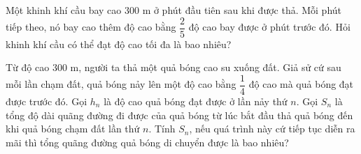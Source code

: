 \begin{bt}%

	Một khinh khí cầu bay cao $300$ m ở phút đầu tiên sau khi được thả. Mỗi phút tiếp theo, nó bay cao 
thêm độ cao bằng $\dfrac{2}{5}$ độ cao bay được ở phút trước đó. Hỏi khinh khí cầu có thể đạt độ cao tối đa là bao nhiêu?
\end{bt}

\begin{bt}%
%
	Từ độ cao $300$ m, người ta thả một quả bóng cao su xuống đất. Giả sử cứ sau mỗi lần chạm đất, quả bóng nảy lên một độ cao bằng $\dfrac{1}{4}$ độ cao mà quả bóng đạt được trước đó. Gọi $h_n$ là độ cao quả bóng đạt được ở lần nảy thứ $n$. Gọi $S_n$ là tổng độ dài quãng đường đi được của quả bóng từ lúc bắt đầu thả quả bóng đến khi quả bóng chạm đất lần thứ $n$. Tính $S_n$, nếu quá trình này cứ tiếp tục diễn ra mãi thì tổng quãng đường quả bóng di chuyển được là bao nhiêu?
\end{bt}

